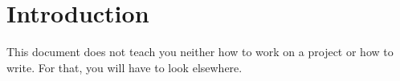 \chapter{Introduction}

This document does not teach you neither how to work on a project or how to write. For that, you will have to look elsewhere\cite{reportwriting}.

